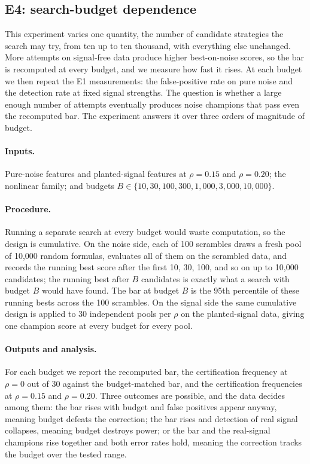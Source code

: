 \documentclass[11pt]{article}
\begin{document}
\subsection{E4: search-budget dependence}

This experiment varies one quantity, the number of candidate
strategies the search may try, from ten up to ten thousand, with everything else unchanged. More attempts
on signal-free data produce higher best-on-noise scores, so the bar is recomputed at every budget, and we
measure how fast it rises. At each budget we then repeat the E1 measurements: the false-positive rate on
pure noise and the detection rate at fixed signal strengths. The question is whether a large enough
number of attempts eventually produces noise champions that pass even the recomputed bar. The experiment
answers it over three orders of magnitude of budget.

\paragraph{Inputs.} Pure-noise features and planted-signal features at $\rho=0.15$ and $\rho=0.20$; the
nonlinear family; and budgets $B \in \{10, 30, 100, 300, 1{,}000, 3{,}000, 10{,}000\}$.

\paragraph{Procedure.} Running a separate search at every budget would waste computation, so the design
is cumulative. On the noise side, each of 100 scrambles draws a fresh pool of 10{,}000 random formulas,
evaluates all of them on the scrambled data, and records the running best score after the first 10, 30,
100, and so on up to 10{,}000 candidates; the running best after $B$ candidates is exactly what a search
with budget $B$ would have found. The bar at budget $B$ is the 95th percentile of these running bests
across the 100 scrambles. On the signal side the same cumulative design is applied to 30 independent
pools per $\rho$ on the planted-signal data, giving one champion score at every budget for every pool.

\paragraph{Outputs and analysis.} For each budget we report the recomputed bar, the certification
frequency at $\rho=0$ out of 30 against the budget-matched bar, and the certification frequencies at
$\rho=0.15$ and $\rho=0.20$. Three outcomes are possible, and the data decides among them: the bar rises
with budget and false positives appear anyway, meaning budget defeats the correction; the bar rises and
detection of real signal collapses, meaning budget destroys power; or the bar and the real-signal
champions rise together and both error rates hold, meaning the correction tracks the budget over the
tested range.
\end{document}
